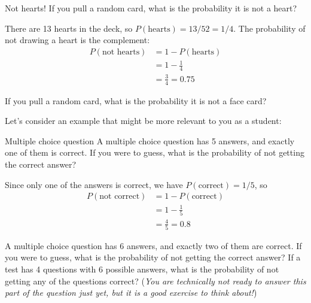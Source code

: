 \begin{example}[https://www.youtube.com/watch?v=YpjdHUsKaow&list=PLfmpjsIzhzts14-9s5QixRje97EI2oeMF&index=16]{Not hearts!}
If you pull a random card, what is the probability it is not a
heart? 

\sol
There are 13 hearts in the deck, so $P(\mbox{hearts}) = 13/52 = 1/4$. The probability of not drawing a heart is the complement:
\begin{align*}
P(\mbox{not hearts}) &= 1 - P(\mbox{hearts})\\
&= 1 - \frac{1}{4}\\
&= \boxed{\frac{3}{4} = 0.75}
\end{align*}
\end{example}

\begin{try}
If you pull a random card, what is the probability it is not a face card?
\end{try}

Let's consider an example that might be more relevant to you as a student: 

\begin{example}[https://www.youtube.com/watch?v=munZCN0L2uA&list=PLfmpjsIzhzts14-9s5QixRje97EI2oeMF&index=17]{Multiple choice question}
A multiple choice question has 5 answers, and exactly one of them is correct. If you were to guess, what is the probability of not getting the correct answer? 

\sol
Since only one of the answers is correct, we have $P(\mbox{correct}) = 1/5$, so
\begin{align*}
P(\mbox{not correct}) &= 1 - P(\mbox{correct})\\
&= 1 - \frac{1}{5}\\
&= \boxed{\frac{4}{5} = 0.8}
\end{align*}
\end{example}

\begin{try}
A multiple choice question has 6 answers, and exactly two of them are correct. If you were to guess, what is the probability of not getting the correct answer?  If a test has 4 questions with 6 possible answers, what is the probability of not getting any of the questions correct? (\emph{You are technically not ready to answer this part of the question just yet, but it is a good exercise to think about!})
\end{try}
\pagebreak

